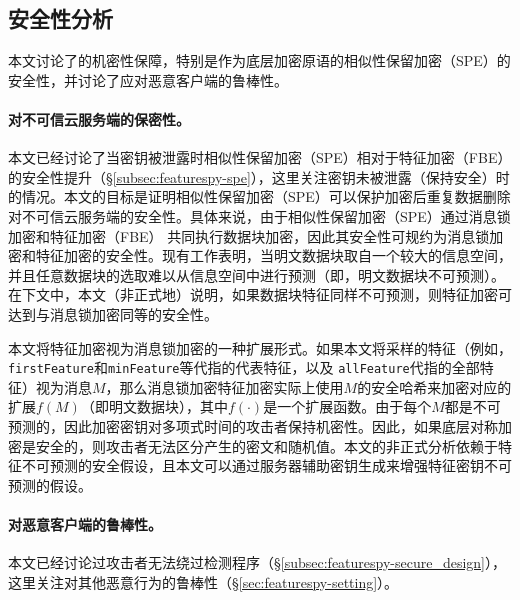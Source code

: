 
\subsection{安全性分析}
\label{subsec:featurespy-security}
本文讨论了\sysnameF 的机密性保障，特别是作为底层加密原语的相似性保留加密（SPE）的安全性，并讨论了\sysnameF 应对恶意客户端的鲁棒性。

\paragraph*{对不可信云服务端的保密性。}

本文已经讨论了当密钥被泄露时相似性保留加密（SPE）相对于特征加密（FBE）的安全性提升（\S\ref{subsec:featurespy-spe}），这里关注密钥未被泄露（保持安全）时的情况。本文的目标是证明相似性保留加密（SPE）可以保护加密后重复数据删除对不可信云服务端的安全性。具体来说，由于相似性保留加密（SPE）通过消息锁加密和特征加密（FBE） 共同执行数据块加密，因此其安全性可规约为消息锁加密和特征加密的安全性。现有工作\cite{bellare2013MLE}表明，当明文数据块取自一个较大的信息空间，并且任意数据块的选取难以从信息空间中进行预测（即，明文数据块不可预测）。在下文中，本文（非正式地）说明，如果数据块特征同样不可预测，则特征加密可达到与消息锁加密同等的安全性。

本文将特征加密视为消息锁加密的一种扩展形式。如果本文将采样的特征（例如，{\tt firstFeature}和{\tt minFeature}等代指的代表特征，以及 {\tt allFeature}代指的全部特征）视为消息$M$，那么消息锁加密特征加密实际上使用$M$的安全哈希来加密对应的扩展$f(M)$（即明文数据块），其中$f(\cdot)$是一个扩展函数。由于每个$M$都是不可预测的，因此加密密钥对多项式时间的攻击者保持机密性。因此，如果底层对称加密是安全的，则攻击者无法区分产生的密文和随机值。本文的非正式分析依赖于特征不可预测的安全假设，且本文可以通过服务器辅助密钥生成\cite{bellare2013DupLESS}来增强特征密钥不可预测的假设。

\paragraph*{对恶意客户端的鲁棒性。}
本文已经讨论过攻击者无法绕过检测程序（\S\ref{subsec:featurespy-secure_design}），这里关注\sysnameF 对其他恶意行为的鲁棒性（\S\ref{sec:featurespy-setting}）。

